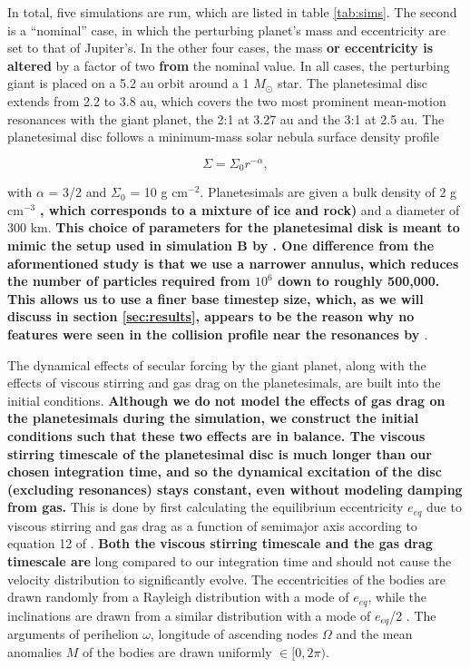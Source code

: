 \documentclass[fleqn,usenatbib]{mnras}
\begin{document}
In total, five simulations are run, which are listed in table
\ref{tab:sims}. The second
is a ``nominal'' case, in which the perturbing planet's mass and 
eccentricity are set to that of Jupiter's. In the other four cases, the mass \textbf{or eccentricity is altered} by a factor of two \textbf{from} the nominal value. In all cases, the perturbing giant is placed on a 5.2 au orbit around a 1 $M_{\odot}$ star. The 
planetesimal disc extends from 2.2 to 3.8 au, which covers the two most prominent mean-motion resonances with the giant planet, the 2:1 at 3.27 au 
and the 3:1 at 2.5 au. The planetesimal disc follows a minimum-mass solar nebula surface density profile \citep{1981PThPS..70...35H}

\begin{equation}\label{eq:surf_den}
	\Sigma = \Sigma_{0} r^{-\alpha},
\end{equation}

\noindent with $\alpha$ = 3/2 and $\Sigma_{0}$ = 10 g cm$^{-2}$. Planetesimals are given a bulk density of 2 g cm$^{-3}$ \textbf{, which corresponds to a mixture of ice and rock)} and a diameter of 
300 km. \textbf{This choice of parameters for the planetesimal disk is meant to mimic the setup used in simulation B by \citet{2000Icar..143...45R}. One difference from the aformentioned study is that we use a narrower annulus, which reduces the number of particles required from $10^6$ down to roughly 500,000. This allows us to use a finer base timestep size, which, as we will discuss in section \ref{sec:results}, appears to be the reason why no features were seen in the collision profile near the resonances by \citet{2000Icar..143...45R}}.

The dynamical effects of secular forcing by the giant planet, along with  the effects of viscous stirring and gas drag on the planetesimals, are 
built into the initial conditions. \textbf{Although we do not model the effects of gas drag on the planetesimals during the simulation, we construct the initial conditions such that these two effects are in balance. The viscous stirring timescale of the planetesimal disc is much longer than our chosen integration time, and so the dynamical excitation of the disc (excluding resonances) stays constant, even without modeling damping from gas.} This is done by first calculating the equilibrium eccentricity $e_{eq}$ due to viscous stirring and gas drag as a 
function of semimajor axis according to equation 12 of \citet{2002ApJ...581..666K}. \textbf{Both the viscous stirring timescale and the gas drag timescale are} long compared to our integration time and should not cause the velocity 
distribution to significantly evolve. The eccentricities of the bodies are drawn randomly from a Rayleigh distribution with a mode of $e_{eq}$, 
while the inclinations are drawn from a similar distribution with a mode of $e_{eq}$/2 \citep{1993MNRAS.263..875I}. The arguments of perihelion 
$\omega$, longitude of ascending nodes $\Omega$ and the mean anomalies $M$ of the bodies are drawn uniformly $\in [0, 2 \pi)$.
\end{document}
